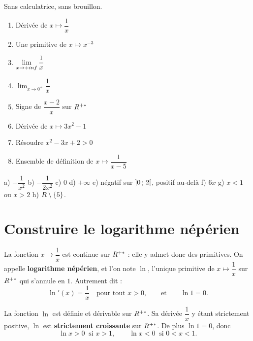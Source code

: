 \begin{automatismes}
Sans calculatrice, sans brouillon.

\begin{enumerate}[label=\textbf{\alph*)}, leftmargin=*, itemsep=0.25em]
  \item Dérivée de $x \mapsto \dfrac{1}{x}$
  \item Une primitive de $x \mapsto x^{-3}$
  \item $\limpinf \dfrac{1}{x}$
  \item $\displaystyle\lim_{x \to 0^{+}} \dfrac{1}{x}$
  \item Signe de $\dfrac{x-2}{x}$ sur $R^{+*}$
  \item Dérivée de $x \mapsto 3x^{2}-1$
  \item Résoudre $x^{2}-3x+2 > 0$
  \item Ensemble de définition de $x \mapsto \dfrac{1}{x-5}$
\end{enumerate}
\end{automatismes}

\begin{corrige}[automatismes]
a) $-\dfrac{1}{x^{2}}$ \quad b) $-\dfrac{1}{2x^{2}}$ \quad c) $0$ \quad
d) $+\infty$ \quad e) négatif sur $\left]0\,;\,2\right[$, positif au-delà \quad
f) $6x$ \quad g) $x<1$ ou $x>2$ \quad h) $R \setminus \{5\}$.
\end{corrige}

\section{Construire le logarithme népérien}

\begin{definition}
La fonction $x \mapsto \dfrac{1}{x}$ est continue sur $R^{+*}$ : elle y admet
donc des primitives. On appelle \textbf{logarithme népérien}, et l'on note
$\ln$, l'unique primitive de $x \mapsto \dfrac{1}{x}$ sur $R^{+*}$ qui s'annule
en $1$. Autrement dit :
\[
  \ln'(x) = \frac{1}{x} \quad \text{pour tout } x>0,
  \qquad \text{et} \qquad \ln 1 = 0 .
\]
\end{definition}

\begin{propriete}
La fonction $\ln$ est définie et dérivable sur $R^{+*}$. Sa dérivée
$\dfrac{1}{x}$ y étant strictement positive, $\ln$ est \textbf{strictement
croissante} sur $R^{+*}$. De plus $\ln 1 = 0$, donc
\[
  \ln x > 0 \ \text{ si } x>1, \qquad \ln x < 0 \ \text{ si } 0<x<1 .
\]
\end{propriete}


